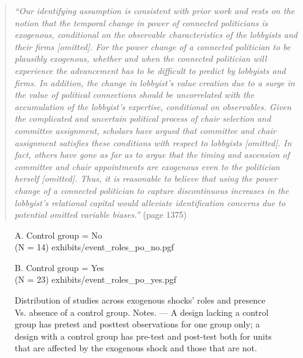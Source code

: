 \documentclass[11pt]{article}
\begin{document}
\begin{refsection}
\begin{quote}
  \textit{
    ``Our identifying assumption is consistent with prior work and rests on the
    notion that the temporal change in power of connected politicians is
    exogenous, conditional on the observable characteristics of the lobbyists
    and their firms [omitted]. For the power change of a connected politician to
    be plausibly exogenous, whether and when the connected politician will
    experience the advancement has to be difficult to predict by lobbyists and
    firms. In addition, the change in lobbyist's value creation due to a surge
    in the value of political connections should be uncorrelated with the
    accumulation of the lobbyist's expertise, conditional on observables. Given
    the complicated and uncertain political process of chair selection and
    committee assignment, scholars have argued that committee and chair
    assignment satisfies these conditions with respect to lobbyists [omitted].
    In fact, others have gone as far as to argue that the timing and ascension
    of committee and chair appointments are exogenous even to the politician
    herself [omitted]. Thus, it is reasonable to believe that using the power
    change of a connected politician to capture discontinuous increases in the
    lobbyist's relational capital would alleviate identification concerns due to
    potential omitted variable biases.''
  }
  (page 1375)
\end{quote}

\begin{figure}[!htbp]
  \raggedleft
  \begin{small}
    \begin{minipage}{0.48\textwidth}
      \centering
      A. Control group = No\\(N = 14)
      \vspace{1.2em}
      {exhibits/event_roles_po_no.pgf}
    \end{minipage}\hfill
    \begin{minipage}{0.48\textwidth}
      \centering
      B. Control group = Yes\\(N = 23)
      {exhibits/event_roles_po_yes.pgf}
    \end{minipage}
    \caption{
      Distribution of studies across exogenous shocks' roles and presence Vs. absence of 
      a control group. Notes. --- A design lacking a control group has pretest and
      posttest observations for one group only; a design with a control group has
      pre-test and post-test both for units that are affected by the exogenous
      shock and those that are not.
    }
    \label{fig:potential_outcome}
  \end{small}
\end{figure}


\end{refsection}
\end{document}
